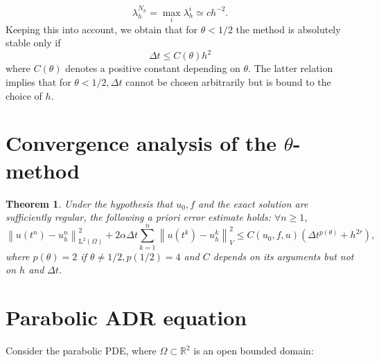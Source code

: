 \documentclass[11pt]{book}
\newtheorem{theorem}{Theorem}
\begin{document}
$$
\lambda_{h}^{N_{h}}=\max _{i} \lambda_{h}^{i} \simeq c h^{-2} .
$$
Keeping this into account, we obtain that for $\theta<1 / 2$ the method is absolutely stable only if
$$
\Delta t \leq C(\theta) h^{2}
$$
where $C(\theta)$ denotes a positive constant depending on $\theta$.
The latter relation implies that for $\theta<1 / 2, \Delta t$ cannot be chosen arbitrarily but is bound to the choice of $h$.

\section{Convergence analysis of the $\theta$-method}
\begin{theorem}
Under the hypothesis that $u_{0}, f$ and the exact solution are sufficiently regular, the following a priori error estimate holds: $\forall n \geq 1$,
\[
\left\|u\left(t^{n}\right)-u_{h}^{n}\right\|_{\mathrm{L}^{2}(\Omega)}^{2}+2 \alpha \Delta t \sum_{k=1}^{n}\left\|u\left(t^{k}\right)-u_{h}^{k}\right\|_{V}^{2} \leq C\left(u_{0}, f, u\right)\left(\Delta t^{p(\theta)}+h^{2 r}\right),
\]
where $p(\theta)=2$ if $\theta \neq 1 / 2, p(1 / 2)=4$ and $C$ depends on its arguments but not on $h$ and $\Delta t$.
\end{theorem}

\section{Parabolic ADR equation}
Consider the parabolic PDE, where $\Omega \subset \mathbb{R}^{2}$ is an open bounded domain:
\end{document}
